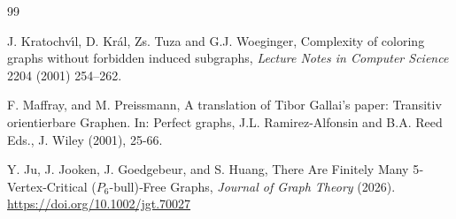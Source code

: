 \documentclass[a4paper,11pt]{article}
\theoremstyle{case}
\begin{document}
\begin{thebibliography}{99}
 

     J. Kratochv\'{\i}l, D. Kr\'al, Zs. Tuza and G.J. Woeginger,
     Complexity of coloring graphs without forbidden induced subgraphs,
     {\sl Lecture Notes in Computer Science} 2204 (2001) 254--262.

     F. Maffray, and M. Preissmann, A translation of Tibor Gallai's paper: Transitiv orientierbare Graphen. In: Perfect graphs, J.L. Ramirez-Alfonsin and B.A. Reed Eds., J. Wiley (2001), 25-66.



Y. Ju, J. Jooken, J. Goedgebeur, and S. Huang, 
There Are Finitely Many 5‐Vertex‐Critical ($P_6$-bull)‐Free Graphs,
{\it Journal of Graph Theory}  (2026). \url{https://doi.org/10.1002/jgt.70027}
\end{thebibliography}

\end{document}
